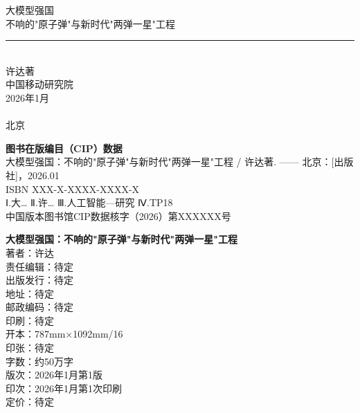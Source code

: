 \begin{titlepage}
\begin{center}
\vspace*{2cm}

{\heiti\textcolor{chaptercolor}{大模型强国}}\\[0.8cm]
{\heiti 不响的"原子弹"与新时代"两弹一星"工程}\\[2cm]

\rule{0.8\textwidth}{0.5pt}\\[1.5cm]

{\fangsong 许\quad 达\quad 著}\\[3cm]

{\songti 中国移动研究院}\\[0.5cm]
{\songti 2026年1月}\\[3cm]

\vfill
{\songti [出版社名称]}\\[0.3cm]
{\songti 北京}
\end{center}
\end{titlepage}

\thispagestyle{empty}
\vspace*{\fill}
\begin{center}
{
\textbf{图书在版编目（CIP）数据}\\[1em]
大模型强国：不响的"原子弹"与新时代"两弹一星"工程 / 许达著. —— 北京：{[出版社]}，2026.01\\
ISBN XXX-X-XXXX-XXXX-X\\[1em]
Ⅰ.大… Ⅱ.许… Ⅲ.人工智能—研究 Ⅳ.TP18\\[1em]
中国版本图书馆CIP数据核字（2026）第XXXXXX号
}
\end{center}
\vspace{2cm}
\begin{center}
{
\textbf{大模型强国：不响的"原子弹"与新时代"两弹一星"工程}\\[1em]
著\quad 者：许\quad 达\\
责任编辑：待定\\
出版发行：待定\\
地\quad 址：待定\\
邮政编码：待定\\
印\quad 刷：待定\\
开\quad 本：787mm×1092mm/16\\
印\quad 张：待定\\
字\quad 数：约50万字\\
版\quad 次：2026年1月第1版\\
印\quad 次：2026年1月第1次印刷\\
定\quad 价：待定
}
\end{center}
\vspace*{\fill}
\newpage
